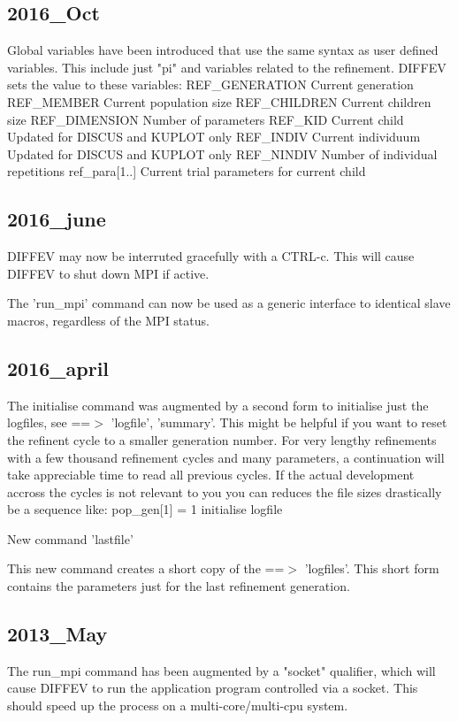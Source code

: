 \subsection*{2016\_Oct}
\par
Global variables have been introduced that use the same syntax as 
user defined variables. This include just "pi" and variables related 
to the refinement. 
DIFFEV sets the value to these variables: 
REF\_GENERATION  Current generation 
REF\_MEMBER      Current population size 
REF\_CHILDREN    Current children size 
REF\_DIMENSION   Number of parameters 
REF\_KID         Current child Updated for DISCUS and KUPLOT only 
REF\_INDIV       Current individuum Updated for DISCUS and KUPLOT only 
REF\_NINDIV      Number of individual repetitions 
ref\_para[1..]   Current trial parameters for current child 
\subsection*{2016\_june}
\par
DIFFEV may now be interruted gracefully with a CTRL-c. 
This will cause DIFFEV to shut down MPI if active. 
\par
The 'run\_mpi' command can now be used as a generic interface to identical 
slave macros, regardless of the MPI status. 
\subsection*{2016\_april}
\par
The initialise command was augmented by a second form to  initialise 
just the logfiles, see ==$> $ 'logfile', 'summary'. 
This might be helpful if you want to reset the refinent cycle 
to a smaller generation number. For very lengthy refinements with 
a few thousand refinement cycles and many parameters, a continuation 
will take appreciable time to read all previous cycles. If the 
actual development accross the cycles is not relevant to you you 
can reduces the file sizes drastically be a sequence like: 
pop\_gen[1] = 1 
initialise logfile 
\par
New command 'lastfile' 
\par
This new command creates a short copy of the ==$> $ 'logfiles'. 
This short form contains the parameters just for the last 
refinement generation. 
\subsection*{2013\_May}
\par
The run\_mpi command has been augmented by a "socket" qualifier, which 
will cause DIFFEV to run the application program controlled via a 
socket. This should speed up the process on a multi-core/multi-cpu 
system. 

